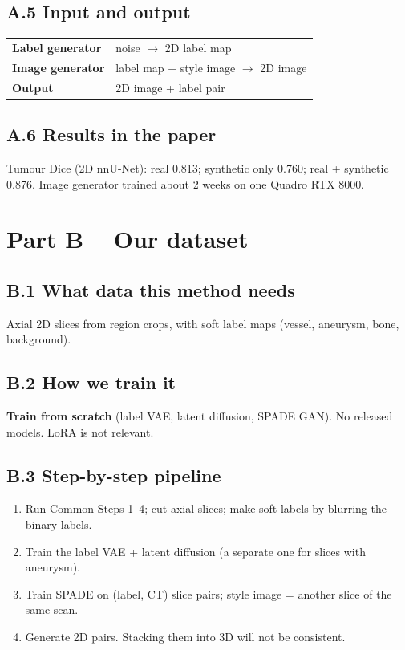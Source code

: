 \documentclass[11pt,a4paper,oneside]{report}
\begin{document}
\subsection*{A.5 Input and output}
\begin{center}
\small
\begin{tabularx}{\linewidth}{lX}
\toprule
\textbf{Label generator} & noise $\rightarrow$ 2D label map \\
\textbf{Image generator} & label map + style image $\rightarrow$ 2D image \\
\textbf{Output} & 2D image + label pair \\
\bottomrule
\end{tabularx}
\end{center}

\subsection*{A.6 Results in the paper}
Tumour Dice (2D nnU-Net): real 0.813; synthetic only 0.760; real + synthetic 0.876. Image generator trained about 2 weeks on one Quadro RTX 8000.

\section{Part B -- Our dataset}

\subsection*{B.1 What data this method needs}
Axial 2D slices from region crops, with soft label maps (vessel, aneurysm, bone, background).

\subsection*{B.2 How we train it}
\textbf{Train from scratch} (label VAE, latent diffusion, SPADE GAN). No released models. LoRA is not relevant.

\subsection*{B.3 Step-by-step pipeline}
\begin{enumerate}
  \item Run Common Steps 1--4; cut axial slices; make soft labels by blurring the binary labels.
  \item Train the label VAE + latent diffusion (a separate one for slices with aneurysm).
  \item Train SPADE on (label, CT) slice pairs; style image = another slice of the same scan.
  \item Generate 2D pairs. Stacking them into 3D will not be consistent.
\end{enumerate}
\end{document}

